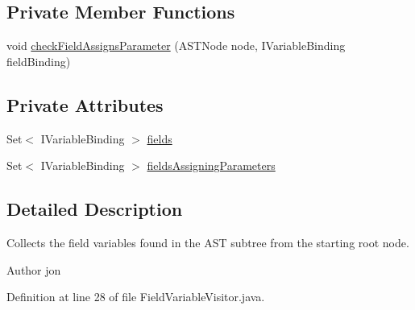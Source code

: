 \subsection*{Private Member Functions}
\begin{DoxyCompactItemize}
\item 
void \hyperlink{classedu_1_1illinois_1_1canistelCassabanana_1_1visitors_1_1FieldVariableVisitor_ae98926107a3a381bfe592763abf9ea7a}{checkFieldAssignsParameter} (ASTNode node, IVariableBinding fieldBinding)
\end{DoxyCompactItemize}
\subsection*{Private Attributes}
\begin{DoxyCompactItemize}
\item 
Set$<$ IVariableBinding $>$ \hyperlink{classedu_1_1illinois_1_1canistelCassabanana_1_1visitors_1_1FieldVariableVisitor_acaed6c0711716585d83b8b742b21ff15}{fields}
\item 
Set$<$ IVariableBinding $>$ \hyperlink{classedu_1_1illinois_1_1canistelCassabanana_1_1visitors_1_1FieldVariableVisitor_a016a1649af7ec44dd7a5464ea7b567b7}{fieldsAssigningParameters}
\end{DoxyCompactItemize}


\subsection{Detailed Description}
Collects the field variables found in the AST subtree from the starting root node.

\begin{DoxyAuthor}{Author}
jon 
\end{DoxyAuthor}


Definition at line 28 of file FieldVariableVisitor.java.



